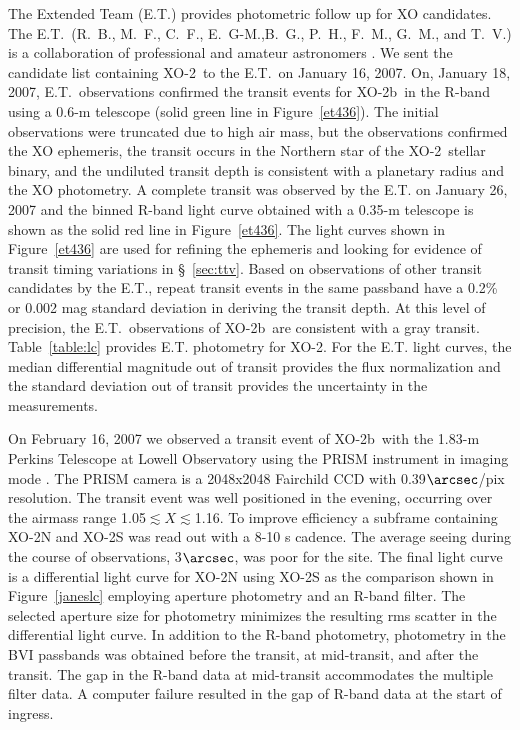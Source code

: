 \documentclass{emulateapj}
\newcommand{\xonb}{XO-2b}
\newcommand{\xon}{XO-2}
\begin{document}
The Extended Team (E.T.) provides photometric follow up for XO
candidates.  The E.T.\ (R.~B., M.~F., C.~F., E.~G-M.,B.~G., P.~H.,
F.~M., G.~M., and T.~V.) is a collaboration of professional and
amateur astronomers \citep{MCC05,MCC06}.  We sent the candidate list
containing \xon\ to the E.T.\ on January 16, 2007.  On, January 18,
2007, E.T.\ observations confirmed the transit events for \xonb\ in the
R-band using a 0.6-m telescope (solid green line in
Figure~\ref{et436}).  The initial observations were truncated due to
high air mass, but the observations confirmed the XO ephemeris, the
transit occurs in the Northern star of the \xon\ stellar binary, and
the undiluted transit depth is consistent with a planetary radius and
the XO photometry.  A complete transit was observed by the E.T. on
January 26, 2007 and the binned R-band light curve obtained with a
0.35-m telescope is shown as the solid red line in Figure~\ref{et436}.
The light curves shown in Figure~\ref{et436} are used for refining the
ephemeris and looking for evidence of transit timing variations in
\S~\ref{sec:ttv}.  Based on observations of other transit candidates
by the E.T., repeat transit events in the same passband have a 0.2\%
or 0.002 mag standard deviation in deriving the transit depth.  At
this level of precision, the E.T.\ observations of
\xonb\ are consistent with a gray transit.  Table~\ref{table:lc}
provides E.T. photometry for \xon.  For the E.T. light
curves, the median differential magnitude out of transit provides the
flux normalization and the standard deviation out of transit provides
the uncertainty in the measurements.

On February 16, 2007 we observed a transit event of \xonb\ with the
1.83-m Perkins Telescope at Lowell Observatory using the PRISM
instrument in imaging mode \citep{JAN04}.  The PRISM camera is a
2048x2048 Fairchild CCD with 0.39$\arcsec$/pix resolution.  The
transit event was well positioned in the evening, occurring over the
airmass range 1.05$\lesssim X\lesssim$1.16.  To improve efficiency a
subframe containing \xon N and \xon S was read out with a 8-10 s
cadence.  The average seeing during the course of observations,
3$\arcsec$, was poor for the site.  The final light curve is a
differential light curve for \xon N using \xon S as the comparison
shown in Figure~\ref{janeslc} employing aperture photometry and an
R-band filter.  The selected aperture size for photometry minimizes
the resulting rms scatter in the differential light curve.  In
addition to the R-band photometry, photometry in the BVI passbands was
obtained before the transit, at mid-transit, and after the transit.
The gap in the R-band data at mid-transit accommodates the multiple
filter data.  A computer failure resulted in the gap of R-band data at
the start of ingress.
\end{document}
